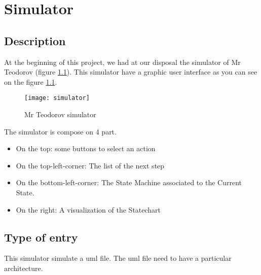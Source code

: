 
\chapter{Simulator}

\section{Description}


At the beginning of this project, we had at our disposal the simulator of Mr Teodorov (figure \ref{fig:sim}). This simulator have a graphic user interface as you can see on the figure \ref{fig:sim}.


\begin{figure}[h]
  \centering
  \texttt{[image: simulator]}
  \caption{Mr Teodorov simulator}
  \label{fig:sim}
\end{figure}


The simulator is compose on 4 part.
\begin{itemize}
\item On the top: some buttons to select an action
\item On the top-left-corner: The list of the next step
\item On the bottom-left-corner: The State Machine associated to the Current State.
\item On the right: A visualization of the Statechart
\end{itemize}

\section{Type of entry}

This simulator simulate a uml file. The uml file need to have a particular architecture. 




